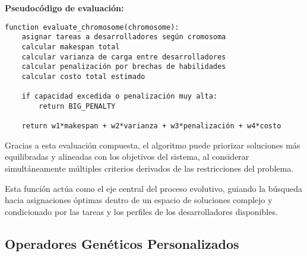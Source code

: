 \noindent\textbf{Pseudocódigo de evaluación:}

\begin{verbatim}
function evaluate_chromosome(chromosome):
    asignar tareas a desarrolladores según cromosoma
    calcular makespan total
    calcular varianza de carga entre desarrolladores
    calcular penalización por brechas de habilidades
    calcular costo total estimado

    if capacidad excedida o penalización muy alta:
        return BIG_PENALTY

    return w1*makespan + w2*varianza + w3*penalización + w4*costo
\end{verbatim}

Gracias a esta evaluación compuesta, el algoritmo puede priorizar soluciones más equilibradas y alineadas con los objetivos del sistema, al considerar simultáneamente múltiples criterios derivados de las restricciones del problema.

Esta función actúa como el eje central del proceso evolutivo, guiando la búsqueda hacia asignaciones óptimas dentro de un espacio de soluciones complejo y condicionado por las tareas y los perfiles de los desarrolladores disponibles.





\subsection{Operadores Genéticos Personalizados}

